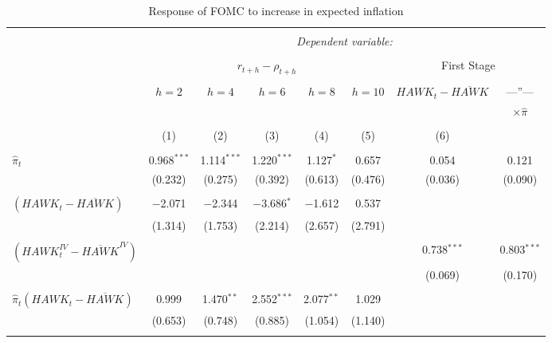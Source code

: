 \documentclass[12pt]{article}
\numberwithin{equation}{section}
\begin{document}
\begin{table}[!htbp] \centering \scriptsize
    \begin{threeparttable}
    \caption{Response of FOMC to increase in expected inflation} 
    \label{tab:full_coef} 
  \begin{tabular}{@{\extracolsep{2pt}}lccccccc} 
  \\[-1.8ex]\hline 
  \hline \\[-1.8ex] 
   & \multicolumn{7}{c}{\textit{Dependent variable:}} \\ 
  \cline{2-7} 
  \\[-1.8ex]  & \multicolumn{5}{c}{$r_{t+h}-\rho_{t+h}$}&\multicolumn{2}{c}{First Stage}\\ 
  \\[-1.8ex] & $h=2$&$h=4$ & $h=6$ & $h=8$& $h=10$ &  $\mathit{HAWK}_t-\overline{\mathit{HAWK}}$& ---''--- \\ &&&&&&& $\times\hat\pi$ \\
  \\[-1.8ex] & (1) & (2) & (3) & (4) & (5) & (6)\\ 
  \hline \\[-1.8ex] 
   $\hat\pi_t$ & 0.968$^{***}$ & 1.114$^{***}$ & 1.220$^{***}$ & 1.127$^{*}$ & 0.657 & 0.054 & 0.121 \\ 
   & (0.232) & (0.275) & (0.392) & (0.613) & (0.476) & (0.036) & (0.090) \\ 
    & & & & & & \\ 
    $\left(\mathit{HAWK}_t-\overline{\mathit{HAWK}}\right)$ & $-$2.071 & $-$2.344 & $-$3.686$^{*}$ & $-$1.612 & 0.537 &  &  \\ 
    & (1.314) & (1.753) & (2.214) & (2.657) & (2.791) &  &  \\ 
    & & & & & & \\ 
    $\left(\mathit{HAWK}_t^\mathit{IV}-\overline{\mathit{HAWK}}^\mathit{IV}\right)$ &  &  &  &  &  & 0.738$^{***}$ & 0.803$^{***}$ \\ 
    &  &  &  &  &  & (0.069) & (0.170) \\ 
    & & & & & & & \\ 
    $\hat\pi_t (\mathit{HAWK}_{t}-\overline{\mathit{HAWK}})$ & 0.999 & 1.470$^{**}$ & 2.552$^{***}$ & 2.077$^{**}$ & 1.029 &  &  \\ 
    & (0.653) & (0.748) & (0.885) & (1.054) & (1.140) &  &  \\ 
    & & & & & & \\ 


\end{tabular}
\end{threeparttable}
\end{table}
\end{document}
